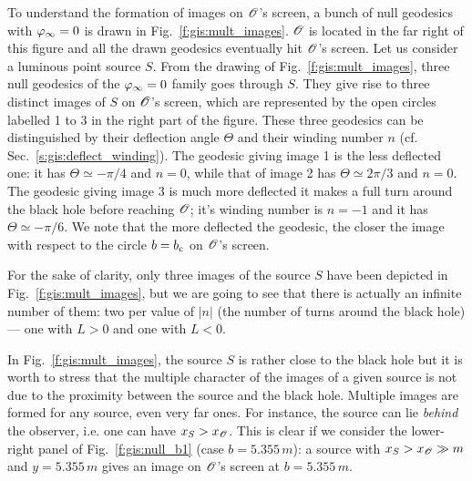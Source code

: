 To understand the formation of images on $\mathscr{O}$'s screen, a bunch of null
geodesics with $\varphi_\infty=0$ is drawn in Fig.~\ref{f:gis:mult_images}.
$\mathscr{O}$ is located in the far right of this figure and
all the drawn geodesics eventually hit $\mathscr{O}$'s screen. Let us consider a luminous point source
$S$. From the drawing of Fig.~\ref{f:gis:mult_images},
three null geodesics of the $\varphi_\infty=0$ family goes through $S$. They give rise to
three distinct images of $S$ on $\mathscr{O}$'s screen, which are represented by the
open circles labelled 1 to 3 in the right part of the figure. These three
geodesics can be distinguished by their deflection angle $\Theta$
and their winding number $n$ (cf. Sec.~\ref{s:gis:deflect_winding}).
The geodesic giving image 1 is the less deflected one: it has $\Theta \simeq - \pi/4$
and $n=0$, while that
of image 2 has $\Theta\simeq 2\pi/3$ and $n=0$.
The geodesic giving image 3 is much more deflected
it makes a full turn around
the black hole before reaching $\mathscr{O}$; it's winding number is $n=-1$ and
it has $\Theta\simeq -\pi/6$.
We note that the more deflected the geodesic,
the closer the image with respect to the circle $b = b_{\rm c}$ on $\mathscr{O}$'s
screen.

For the sake of clarity, only three images of the source $S$ have been
depicted in Fig.~\ref{f:gis:mult_images}, but we are going to see
that there is actually an infinite
number of them: two per value of $|n|$ (the number of turns around the black hole)
--- one with $L>0$ and one with $L<0$.

\begin{remark}
In Fig.~\ref{f:gis:mult_images}, the source $S$ is rather close to the
black hole but it is worth to stress that
the multiple character of the images of a given
source is not due to the proximity between the source and the black hole.
Multiple images are formed for any source, even very far ones.
For instance, the source can lie \emph{behind} the
observer, i.e. one can have $x_S > x_{\mathscr{O}}$. This is clear if we consider
the lower-right panel of Fig.~\ref{f:gis:null_b1} (case $b=5.355\, m$):
a source with $x_S > x_{\mathscr{O}} \gg m$ and $y=5.355\, m$ gives an image on
$\mathscr{O}$'s screen at $b=5.355\, m$.
\end{remark}


